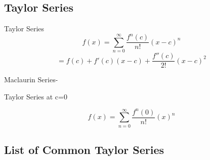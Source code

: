 \documentclass[12pt]{article}
\numberwithin{equation}{subsection}
\begin{document}
\subsection{Taylor Series}
Taylor Series
\begin{equation}
f(x)=\sum_{n=0}^{\infty}\frac{f^{n}(c)}{n!}(x-c)^{n}
\end{equation}
\begin{equation}
=f(c)+f'(c)(x-c)+\frac{f''(c)}{2!}(x-c)^{2}
\end{equation}

\begin{flushleft}
Maclaurin Series- \begin{small} Taylor Series at c=0 \end{small}
\begin{equation}
f(x)=\sum_{n=0}^{\infty}\frac{f^{n}(0)}{n!}(x)^{n}
\end{equation}
\end{flushleft}
\newpage

\subsection{List of Common Taylor Series}
\end{document}
